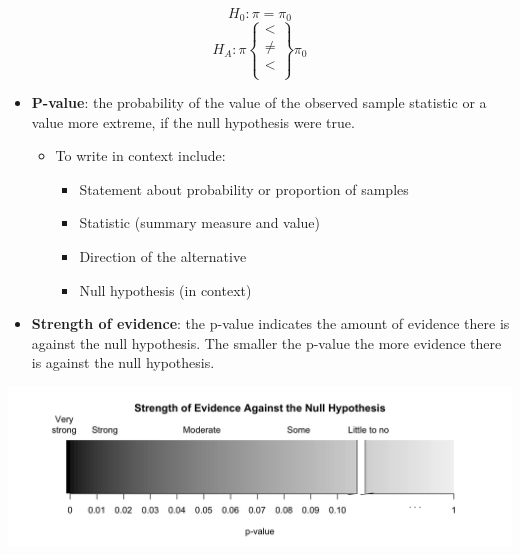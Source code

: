 \documentclass[
]{report}
\begin{document}
\[H_0: \pi = \pi_0\]
\[H_A: \pi \left\{
\begin{array}{ll}
< \\
\ne \\
< \\
\end{array}
\right\}
\pi_0 \]

\begin{itemize}
\item
  \textbf{P-value}: the probability of the value of the observed sample statistic or a value more extreme, if the null hypothesis were true.

  \begin{itemize}
  \item
    To write in context include:

    \begin{itemize}
    \item
      Statement about probability or proportion of samples
    \item
      Statistic (summary measure and value)
    \item
      Direction of the alternative
    \item
      Null hypothesis (in context)
    \end{itemize}
  \end{itemize}
\item
  \textbf{Strength of evidence}: the p-value indicates the amount of evidence there is against the null hypothesis. The smaller the p-value the more evidence there is against the null hypothesis.
\end{itemize}

\begin{center}\includegraphics[width=0.9\linewidth]{images/soe_gradient_gray} \end{center}

\newpage
\end{document}
